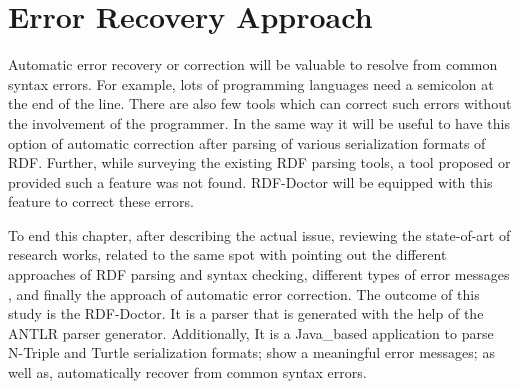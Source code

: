 \section{Error Recovery Approach}
Automatic error recovery or correction will be valuable to resolve from common syntax errors. For example, lots of programming languages need a semicolon at the end of the line. There are also few tools which can correct such errors without the involvement of the programmer. In the same way it will be useful to have this option of automatic correction after parsing of various serialization formats of RDF. Further, while surveying the existing RDF parsing tools, a tool proposed or provided such a feature was not found. RDF-Doctor will be equipped with this feature to correct these errors.   

\par
To end this chapter, after describing the actual issue, reviewing the  state-of-art of research works, related to the same spot with pointing out  the different approaches of RDF parsing and syntax checking, different types of error messages , and finally the approach of automatic error correction. The outcome of this study is the RDF-Doctor. It is a parser that is generated with the help of the ANTLR parser generator. Additionally, It is a Java\_based application to parse N-Triple and Turtle serialization formats; show a meaningful error messages; as well as, automatically recover from common syntax errors.    










